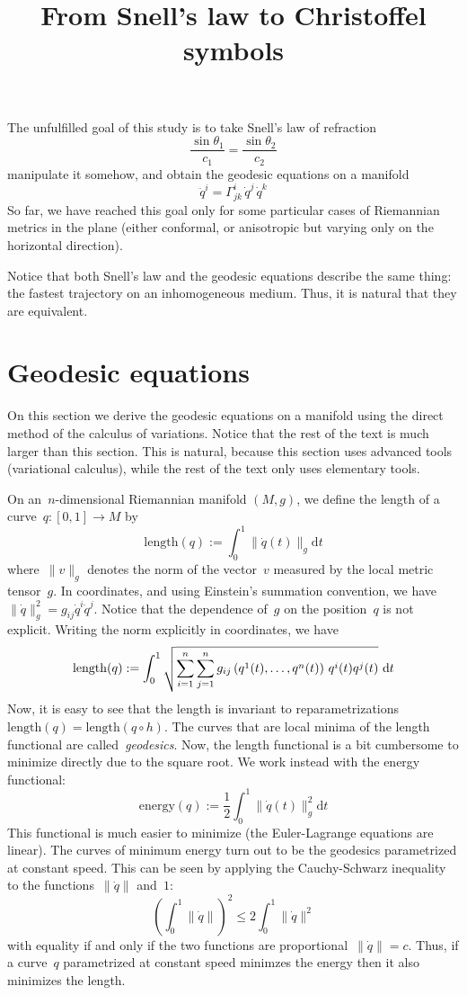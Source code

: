 \title{From Snell's law to Christoffel symbols}

The unfulfilled goal of this study is to take Snell's law of refraction
$$
\frac{\sin\theta_1}{c_1}=\frac{\sin\theta_2}{c_2}
$$
manipulate it somehow, and obtain the geodesic equations on a manifold
$$
\ddot q^i = \Gamma^i_{jk}\,\dot q^j\,\dot q^k
$$
So far, we have reached this goal only for some particular cases of Riemannian
metrics in the plane (either conformal, or anisotropic but varying only on the
horizontal direction).

Notice that both Snell's law and the geodesic equations describe the same
thing: the fastest trajectory on an inhomogeneous medium.  Thus, it is natural
that they are equivalent.

\section{Geodesic equations}

On this section we derive the geodesic equations on a manifold using the
direct method of the calculus of variations.  Notice that the rest of the
text is much larger than this section.  This is natural, because this section
uses advanced tools (variational calculus), while the rest of the text only
uses elementary tools.


On an~$n$-dimensional Riemannian manifold $(M,g)$, we define the length of a
curve~$q:[0,1]\to M$ by
$$
\mathrm{length}(q) := \int_0^1 \|\dot q(t)\|_g\mathrm{d} t
$$
where~$\|v\|_g$ denotes the norm of the vector~$v$ measured by the local
metric tensor~$g$.  In coordinates, and using Einstein's summation
convention, we have~$\|\dot q\|^2_g=g_{ij}\dot q^i\dot q^j$.  Notice that the
dependence of~$g$ on the position~$q$ is not explicit.  Writing the norm
explicitly in coordinates, we have
$$
\mathrm{length}(q) := \int_0^1
\sqrt{
	\sum_{i=1}^n
	\sum_{j=1}^n
	g_{ij}\left(q^1(t),\ldots,q^n(t)\right)
	\,
	q^i(t)
	q^j(t)
}
\ \mathrm{d} t
$$
Now, it is easy to see that the length is invariant to reparametrizations
$\mathrm{length}(q)=\mathrm{length}(q\circ h)$.  The curves that are local
minima of the length functional are called~\emph{geodesics}.  Now, the length
functional is a bit cumbersome to minimize directly due to the square root.
We work instead with the energy functional:
$$
\mathrm{energy}(q) := \frac{1}{2}\int_0^1 \|\dot q(t)\|^2_g\mathrm{d} t
$$
This functional is much easier to minimize (the Euler-Lagrange equations are
linear).  The curves of minimum energy turn out to be the geodesics
parametrized at constant speed.  This can be seen by applying the
Cauchy-Schwarz inequality to the functions~$\|\dot q\|$ and~$1$:
$$
\left(\int_0^1\|\dot q\|\right)^2\le2\int_0^1\|\dot q\|^2
$$
with equality if and only if the two functions are proportional~$\|\dot
q\|=c$.  Thus, if a curve~$q$ parametrized at constant speed minimzes the
energy then it also minimizes the length.

